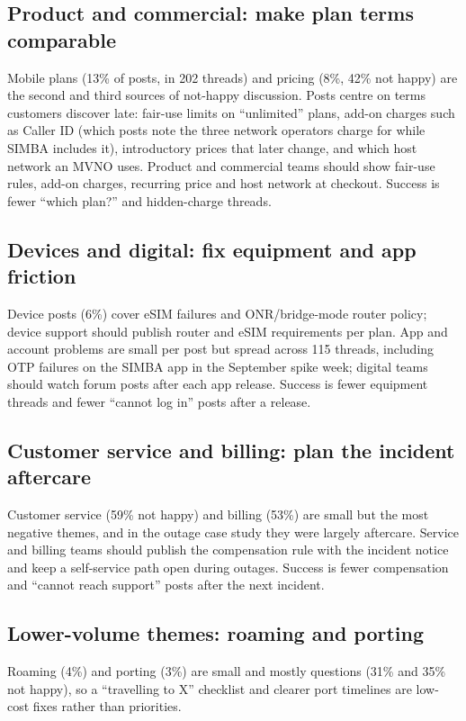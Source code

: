 \documentclass[11pt,a4paper]{article}
\begin{document}
\subsection{Product and commercial: make plan terms comparable}

Mobile plans (13\% of posts, in 202 threads) and pricing (8\%, 42\% not happy) are the second and third sources of not-happy discussion. Posts centre on terms customers discover late: fair-use limits on ``unlimited'' plans, add-on charges such as Caller ID (which posts note the three network operators charge for while SIMBA includes it), introductory prices that later change, and which host network an MVNO uses. Product and commercial teams should show fair-use rules, add-on charges, recurring price and host network at checkout. Success is fewer ``which plan?'' and hidden-charge threads.

\subsection{Devices and digital: fix equipment and app friction}

Device posts (6\%) cover eSIM failures and ONR/bridge-mode router policy; device support should publish router and eSIM requirements per plan. App and account problems are small per post but spread across 115 threads, including OTP failures on the SIMBA app in the September spike week; digital teams should watch forum posts after each app release. Success is fewer equipment threads and fewer ``cannot log in'' posts after a release.

\subsection{Customer service and billing: plan the incident aftercare}

Customer service (59\% not happy) and billing (53\%) are small but the most negative themes, and in the outage case study they were largely aftercare. Service and billing teams should publish the compensation rule with the incident notice and keep a self-service path open during outages. Success is fewer compensation and ``cannot reach support'' posts after the next incident.

\subsection{Lower-volume themes: roaming and porting}

Roaming (4\%) and porting (3\%) are small and mostly questions (31\% and 35\% not happy), so a ``travelling to X'' checklist and clearer port timelines are low-cost fixes rather than priorities.
\end{document}

